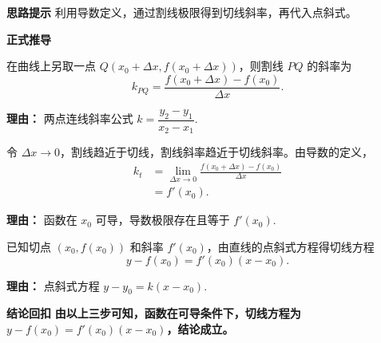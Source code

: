 \begin{proofbox}
	\textbf{\textcolor{CProof}{思路提示}}
	利用导数定义，通过割线极限得到切线斜率，再代入点斜式。

	\medskip
	\textbf{\textcolor{CProof}{正式推导}}
	\begin{description}[style=nextline, leftmargin=2.8em, labelsep=0.5em, itemsep=0.55em]
		\item[\textbf{步骤一（割线斜率）：}]
			在曲线上另取一点 $Q(x_0 + \Delta x, f(x_0 + \Delta x))$，则割线 $PQ$ 的斜率为
			\[
				k_{PQ} = \frac{f(x_0 + \Delta x) - f(x_0)}{\Delta x}.
			\]
			\par\textbf{理由：} 两点连线斜率公式 $k = \dfrac{y_2 - y_1}{x_2 - x_1}$.
		\item[\textbf{步骤二（极限取斜）：}]
			令 $\Delta x \to 0$，割线趋近于切线，割线斜率趋近于切线斜率。由导数的定义，
			\[
				\begin{aligned}
					k_t &= \lim_{\Delta x \to 0} \frac{f(x_0 + \Delta x) - f(x_0)}{\Delta x} \\ &= f'(x_0).
			\end{aligned}
			\]
			\par\textbf{理由：} 函数在 $x_0$ 可导，导数极限存在且等于 $f'(x_0)$.
		\item[\textbf{步骤三（点斜方程）：}]
			已知切点 $(x_0, f(x_0))$ 和斜率 $f'(x_0)$，由直线的点斜式方程得切线方程
			\[
				\boxed{y - f(x_0) = f'(x_0)(x - x_0)}.
			\]
			\par\textbf{理由：} 点斜式方程 $y - y_0 = k(x - x_0)$.
	\end{description}

	\medskip
	\textbf{\textcolor{CProof}{结论回扣}}
	\textbf{由以上三步可知，函数在可导条件下，切线方程为 $y - f(x_0) = f'(x_0)(x - x_0)$，结论成立。}
\end{proofbox}
